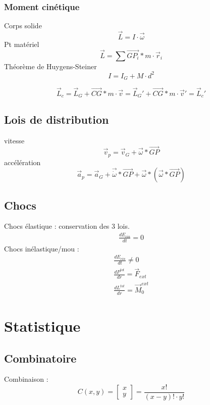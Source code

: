 	\subsubsection{Moment cinétique}
	Corps solide
	\begin{equation}
	\vec{L}=I \cdot \vec{\omega}
	\end{equation}
	Pt matériel
	\begin{equation}
	\vec{L}=\sum \vec{GP_i}*m\cdot \vec{r}_i
	\end{equation}
	Théorème de Huygens-Steiner
	\begin{equation}
	I=I_G+M \cdot d^2
	\end{equation}
	
	\begin{equation}
	\vec{L}_c=\vec{L}_G+ \vec{CG} * m \cdot \vec{v}=\vec{L}_G'+ \vec{CG} * m \cdot \vec{v}'=\vec{L}_c'
	\end{equation}
	
	\subsection{Lois de distribution}
	vitesse
	\begin{equation}
	\vec{v}_p=\vec{v}_G+\vec{\omega}*\vec{GP}
	\end{equation}
	accélération
	\begin{equation}
	\vec{a}_p=\vec{a}_G+\vec{\dot{\omega}}*\vec{GP}+\vec{\omega}*(\vec{\omega}*\vec{GP})
	\end{equation}
	
	\subsection{Chocs}
	Chocs élastique : conservation des 3 lois. 
	\begin{eqnarray}
	\frac{dE_{cin}}{dt} =0
	\end{eqnarray}
	Chocs inélastique/mou :
	\begin{eqnarray}
	\frac{dE_{cin}}{dt} \neq 0\\
	\frac{d P^{tot}}{dr}=\vec{F}_{ext}\\
	\frac{d L^{tot}}{dr}=\vec{M}_{0}^{ext}
	\end{eqnarray}
	
	\newpage
	\section{Statistique}
	\subsection{Combinatoire}
	Combinaison : 
	\begin{equation}
	C(x,y)=\begin{bmatrix}
	x\\
	y
	\end{bmatrix}=\frac{x!}{(x-y)!\cdot y!}
	\end{equation}
	
